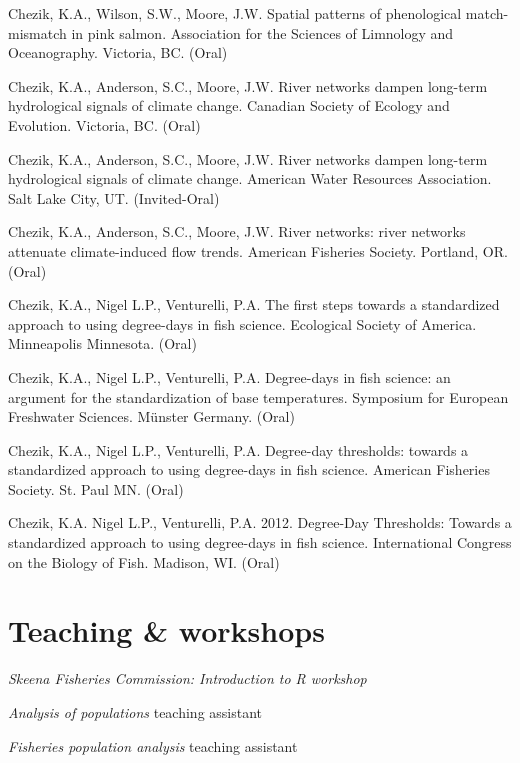\begin{description}
\tightlist

\item[2018] Chezik, K.A., Wilson, S.W., Moore, J.W. Spatial patterns of phenological match-mismatch in pink salmon. Association for the Sciences of Limnology and Oceanography. Victoria, BC. (Oral)
\item[2017] Chezik, K.A., Anderson, S.C., Moore, J.W. River networks dampen long-term hydrological signals of climate change. Canadian Society of Ecology and Evolution. Victoria, BC. (Oral)
\item[2017] Chezik, K.A., Anderson, S.C., Moore, J.W. River networks dampen long-term hydrological signals of climate change. American Water Resources Association. Salt Lake City, UT. (Invited-Oral)
\item[2015] Chezik, K.A., Anderson, S.C., Moore, J.W. River networks: river networks attenuate climate-induced flow trends. American Fisheries Society. Portland, OR. (Oral)
\item[2013] Chezik, K.A., Nigel L.P., Venturelli, P.A. The first steps towards a standardized approach to using degree-days in fish science. Ecological Society of America. Minneapolis Minnesota. (Oral)
\item[2013] Chezik, K.A., Nigel L.P., Venturelli, P.A. Degree-days in fish science: an argument for the standardization of base temperatures. Symposium for European Freshwater Sciences. Münster Germany. (Oral)
\item[2012] Chezik, K.A., Nigel L.P., Venturelli, P.A. Degree-day thresholds: towards a standardized approach to using degree-days in fish science. American Fisheries Society. St. Paul MN. (Oral)
\item[2012] Chezik, K.A. Nigel L.P., Venturelli, P.A. 2012. Degree-Day Thresholds: Towards a standardized approach to using degree-days in fish science. International Congress on the Biology of Fish. Madison, WI. (Oral)

\end{description}



\section{Teaching \& workshops}

\begin{description}
\tightlist

\item[2016] \textit{Skeena Fisheries Commission: Introduction to R workshop}
\item[2013] \textit{Analysis of populations} teaching assistant
\item[2011] \textit{Fisheries population analysis} teaching assistant

\end{description}



